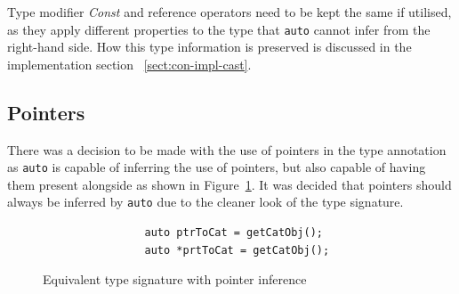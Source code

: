 \documentclass[bsc,frontabs,singlespacing,twoside,parskip,deptreport]{infthesis}
\begin{document}
Type modifier \textit{Const} and reference operators need to be kept the same if utilised, as they apply different properties to the type that \texttt{auto} cannot infer from the right-hand side. How this type information is preserved is discussed in the implementation section~ \ref{sect:con-impl-cast}. 

\subsection{Pointers}
There was a decision to be made with the use of pointers in the type annotation as \texttt{auto} is capable of inferring the use of pointers, but also capable of having them present alongside as shown in Figure~\ref{fig:ptr_type_inf}. It was decided that pointers should always be inferred by \texttt{auto} due to the cleaner look of the type signature. 

\begin{figure}[!h]
    \centering
    \begin{verbatim}
                auto ptrToCat = getCatObj();
                auto *prtToCat = getCatObj();
    \end{verbatim}
    \caption{Equivalent type signature with pointer inference}
    \label{fig:ptr_type_inf}
\end{figure}

\end{document}
